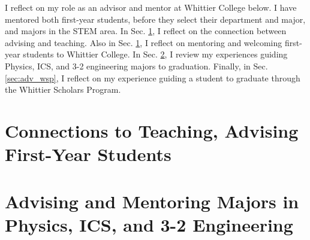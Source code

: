 \documentclass[../../main.tex]{subfiles}
\begin{document}
\label{sec:advising_mentoring}

I reflect on my role as an advisor and mentor at Whittier College below.  I have mentored both first-year students, before they select their department and major, and majors in the STEM area.  In Sec. \ref{sec:adv_teaching}, I reflect on the connection between advising and teaching.  Also in Sec. \ref{sec:adv_teaching}, I reflect on mentoring and welcoming first-year students to Whittier College.  In Sec. \ref{sec:adv_stem}, I review my experiences guiding Physics, ICS, and 3-2 engineering majors to graduation.  Finally, in Sec. \ref{sec:adv_wsp}, I reflect on my experience guiding a student to graduate through the Whittier Scholars Program.

\section{Connections to Teaching, Advising First-Year Students}
\label{sec:adv_teaching}

%

\begin{flushleft}

\end{flushleft}


%

%

\section{Advising and Mentoring Majors in Physics, ICS, and 3-2 Engineering}
\label{sec:adv_stem}

%
\end{document}
